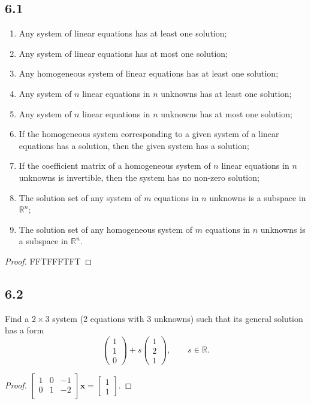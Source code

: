 \documentclass{amsart}
\begin{document}
\subsection*{6.1}
\begin{enumerate}[label=\alph*)]
  \item Any system of linear equations has at least one solution;
  \item Any system of linear equations has at most one solution;
  \item Any homogeneous system of linear equations has at least one solution;
  \item Any system of $n$ linear equations in $n$ unknowns has at least one solution;
  \item Any system of $n$ linear equations in $n$ unknowns has at most one solution;
  \item If the homogeneous system corresponding to a given system of a linear equations has a solution, then the given system has a solution;
  \item If the coefficient matrix of a homogeneous system of $n$ linear equations in $n$ unknowns is invertible, then the system has no non-zero solution;
  \item The solution set of any system of $m$ equations in $n$ unknowns is a subspace in $\mathbb{R}^n$;
  \item The solution set of any homogeneous system of $m$ equations in $n$ unknowns is a subspace in $\mathbb{R}^n$.
\end{enumerate}
\begin{proof}
  FFTFFFTFT
\end{proof}

\subsection*{6.2}
Find a $2 \times 3$ system (2 equations with 3 unknowns) such that its general solution has a form
\[
\begin{pmatrix} 1 \\ 1 \\ 0 \end{pmatrix}
+ s \begin{pmatrix} 1 \\ 2 \\ 1 \end{pmatrix}, \qquad s \in \mathbb{R}.
\]
\begin{proof}
    $\begin{bmatrix}
        1 & 0 & -1 \\ 
        0 & 1 & -2 \\ 
    \end{bmatrix}\textbf{x} =\begin{bmatrix}
        1 \\ 1
    \end{bmatrix}$. 
\end{proof}
\end{document}
